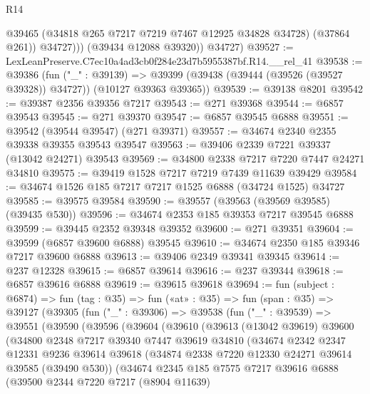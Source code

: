 \begin{lexlean}{R14}
\begin{coremodule}
                @39465
                (@34818 @265 @7217 @7219 @7467 @12925 @34828 @34728)
                (@37864 @261))
              @34727)))
        (@39434 @12088 @39320))
      @34727)
@39527 := LexLeanPreserve.C7ec10a4ad3cb0f284e23d7b5955387bf.R14.__rel_41
@39538 := @39386
    (fun ("_" : @39139) =>
    @39399 (@39438 (@39444 (@39526 (@39527 @39328)) @34727)) (@10127 @39363 @39365))
@39539 := @39138 @8201
@39542 := @39387 @2356 @39356 @7217
@39543 := @271 @39368
@39544 := @6857 @39543
@39545 := @271 @39370
@39547 := @6857 @39545 @6888
@39551 := @39542 (@39544 @39547) (@271 @39371)
@39557 := @34674 @2340 @2355 @39338 @39355 @39543 @39547
@39563 := @39406 @2339 @7221 @39337 (@13042 @24271) @39543
@39569 := @34800 @2338 @7217 @7220 @7447 @24271 @34810
@39575 := @39419 @1528 @7217 @7219 @7439 @11639 @39429
@39584 := @34674 @1526 @185 @7217 @7217 @1525 @6888 (@34724 @1525) @34727
@39585 := @39575 @39584
@39590 := @39557 (@39563 (@39569 @39585) (@39435 @530))
@39596 := @34674 @2353 @185 @39353 @7217 @39545 @6888
@39599 := @39445 @2352 @39348 @39352
@39600 := @271 @39351
@39604 := @39599 (@6857 @39600 @6888) @39545
@39610 := @34674 @2350 @185 @39346 @7217 @39600 @6888
@39613 := @39406 @2349 @39341 @39345
@39614 := @237 @12328
@39615 := @6857 @39614
@39616 := @237 @39344
@39618 := @6857 @39616 @6888
@39619 := @39615 @39618
@39694 := fun (subject : @6874) =>
  fun (tag : @35) =>
  fun («at» : @35) =>
  fun (span : @35) =>
  @39127
    (@39305
      (fun ("_" : @39306) =>
      @39538
        (fun ("_" : @39539) =>
        @39551
          (@39590
            (@39596
              (@39604
                (@39610
                  (@39613
                    (@13042 @39619)
                    @39600
                    (@34800
                      @2348
                      @7217
                      @39340
                      @7447
                      @39619
                      @34810
                      (@34674
                        @2342
                        @2347
                        @12331
                        @9236
                        @39614
                        @39618
                        (@34874 @2338 @7220 @12330 @24271 @39614 @39585 (@39490 @530))
                        (@34674
                          @2345
                          @185
                          @7575
                          @7217
                          @39616
                          @6888
                          (@39500
                            @2344
                            @7220
                            @7217
                            (@8904 @11639)

\end{coremodule}
\end{lexlean}
